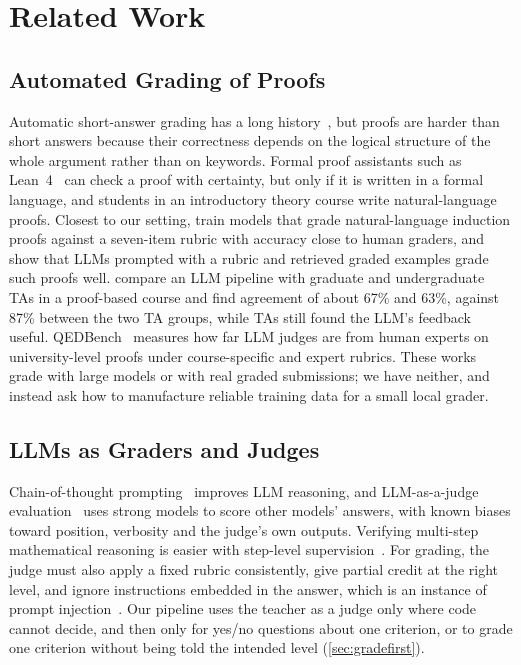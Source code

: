 \documentclass[11pt,a4paper]{article}
\theoremstyle{definition}
\begin{document}
\section{Related Work}\label{sec:related}

\subsection{Automated Grading of Proofs}
Automatic short-answer grading has a long history~\cite{burrows2015eras}, but proofs are harder than short answers because their correctness depends on the logical structure of the whole argument rather than on keywords. Formal proof assistants such as Lean~4~\cite{demoura2021lean} can check a proof with certainty, but only if it is written in a formal language, and students in an introductory theory course write natural-language proofs. Closest to our setting, \citet{zhao2024induction} train models that grade natural-language induction proofs against a seven-item rubric with accuracy close to human graders, and \citet{zhao2025fewshot} show that LLMs prompted with a rubric and retrieved graded examples grade such proofs well. \citet{mahinpei2026tas} compare an LLM pipeline with graduate and undergraduate TAs in a proof-based course and find agreement of about 67\% and 63\%, against 87\% between the two TA groups, while TAs still found the LLM's feedback useful. QEDBench~\cite{gonzalez2026qedbench} measures how far LLM judges are from human experts on university-level proofs under course-specific and expert rubrics. These works grade with large models or with real graded submissions; we have neither, and instead ask how to manufacture reliable training data for a small local grader.

\subsection{LLMs as Graders and Judges}
Chain-of-thought prompting~\cite{wei2022cot} improves LLM reasoning, and LLM-as-a-judge evaluation~\cite{zheng2023judging} uses strong models to score other models' answers, with known biases toward position, verbosity and the judge's own outputs. Verifying multi-step mathematical reasoning is easier with step-level supervision~\cite{lightman2024verify}. For grading, the judge must also apply a fixed rubric consistently, give partial credit at the right level, and ignore instructions embedded in the answer, which is an instance of prompt injection~\cite{greshake2023injection}. Our pipeline uses the teacher as a judge only where code cannot decide, and then only for yes/no questions about one criterion, or to grade one criterion without being told the intended level (\cref{sec:gradefirst}).
\end{document}
